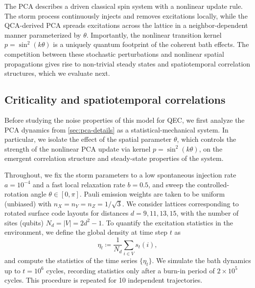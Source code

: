 \documentclass[
    aps,
    prx,
    reprint,
    superscriptaddress,
    longbibliography,
    nofootinbib,
    floatfix,
]{revtex4-2}
\begin{document}
The PCA describes a driven classical spin system with a nonlinear update rule. The storm process continuously injects and removes excitations locally, while the QCA-derived PCA spreads excitations across the lattice in a neighbor-dependent manner parameterized by \(\theta\). Importantly, the nonlinear transition kernel \(p = \sin^2(k\theta)\) is a uniquely quantum footprint of the coherent bath effects. The competition between these stochastic perturbations and nonlinear spatial propagations gives rise to non-trivial steady states and spatiotemporal correlation structures, which we evaluate next.

\subsection{Criticality and spatiotemporal correlations}\label{sec:qca-stat-mech}
Before studying the noise properties of this model for QEC, we first analyze the PCA dynamics from \cref{sec:pca-details} as a statistical-mechanical system. In particular, we isolate the effect of the spatial parameter \(\theta\), which controls the strength of the nonlinear PCA update via kernel \(p = \sin^2(k\theta)\), on the emergent correlation structure and steady-state properties of the system.

Throughout, we fix the storm parameters to a low spontaneous injection rate \(a=10^{-4}\) and a fast local relaxation rate \(b=0.5\), and sweep the controlled-rotation angle \(\theta \in [0, \pi]\). Pauli emission weights are taken to be uniform (unbiased) with \(n_X = n_Y = n_Z = 1/\sqrt{3}\). We consider lattices corresponding to rotated surface code layouts for distances \(d=9, 11, 13, 15\), with the number of sites (qubits) \(N_d = |V| = 2d^2 - 1\). To quantify the excitation statistics in the environment, we define the global density at time step \(t\) as
\begin{equation}
    \eta_t \coloneq \frac{1}{N_d}\sum_{i\in V} s_t(i),
\end{equation}
and compute the statistics of the time series \(\{\eta_t\}\). We simulate the bath dynamics up to \(t=10^6\) cycles, recording statistics only after a burn-in period of \(2 \times 10^5\) cycles. This procedure is repeated for 10 independent trajectories.
\end{document}
